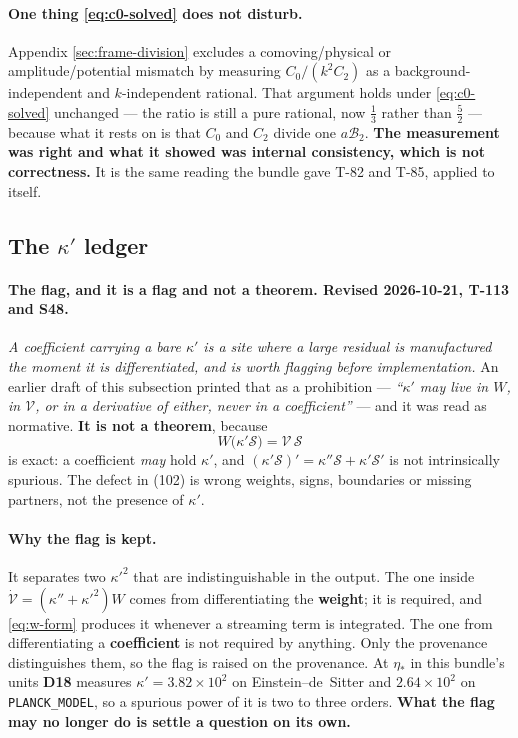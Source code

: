 \paragraph{One thing \eqref{eq:c0-solved} does not disturb.} Appendix
\ref{sec:frame-division} excludes a comoving/physical or amplitude/potential
mismatch by measuring $C_0/(k^2C_2)$ as a background-independent and
$k$-independent rational. That argument holds under
\eqref{eq:c0-solved} unchanged --- the ratio is still a pure rational, now
$\tfrac13$ rather than $\tfrac52$ --- because what it rests on is that $C_0$
and $C_2$ divide one $a\mathcal B_2$. \textbf{The measurement was right and
what it showed was internal consistency, which is not correctness.} It is
the same reading the bundle gave T-82 and T-85, applied to itself.

\subsection{The $\kappa'$ ledger}
\label{sec:kappa-ledger}

\paragraph{The flag, and it is a flag and not a theorem.
\textnormal{\textbf{Revised 2026-10-21, T-113 and S48.}}} \emph{A coefficient
carrying a bare $\kappa'$ is a site where a large residual is manufactured the
moment it is differentiated, and is worth flagging before implementation.} An
earlier draft of this subsection printed that as a prohibition --- \emph{``$\kappa'$
may live in $W$, in $\mathcal V$, or in a derivative of either, never in a
coefficient''} --- and it was read as normative. \textbf{It is not a theorem},
because
\begin{equation}
  W\big(\kappa'\mathcal S\big)=\mathcal V\,\mathcal S
  \label{eq:ledger-identity}
\end{equation}
is exact: a coefficient \emph{may} hold $\kappa'$, and
$(\kappa'\mathcal S)'=\kappa''\mathcal S+\kappa'\mathcal S'$ is not
intrinsically spurious. The defect in (102) is wrong weights, signs,
boundaries or missing partners, not the presence of $\kappa'$.

\paragraph{Why the flag is kept.} It separates two $\kappa'^2$ that are
indistinguishable in the output. The one inside
$\dot{\mathcal V}=(\kappa''+\kappa'^2)W$ comes from differentiating the
\textbf{weight}; it is required, and \eqref{eq:w-form} produces it whenever a
streaming term is integrated. The one from differentiating a
\textbf{coefficient} is not required by anything. Only the provenance
distinguishes them, so the flag is raised on the provenance. At $\eta_*$ in
this bundle's units \textbf{D18} measures $\kappa'=3.82\times10^2$ on
Einstein--de~Sitter and $2.64\times10^2$ on \texttt{PLANCK\_MODEL}, so a
spurious power of it is two to three orders. \textbf{What the flag may no
longer do is settle a question on its own.}

